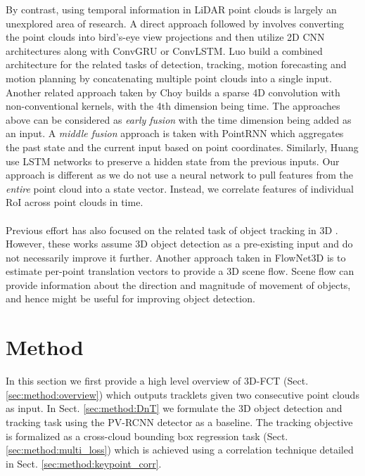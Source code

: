 \documentclass[10pt,twocolumn,letterpaper]{article}
\begin{document}
By contrast, using temporal information in LiDAR point clouds is largely an unexplored area of research. A direct approach followed by \cite{McCrae2020,Sallab2018,Yin2020} involves converting the point clouds into bird's-eye view projections and then utilize 2D CNN architectures along with ConvGRU or ConvLSTM. Luo \etal \cite{Luo2018} build a combined architecture for the related tasks of detection, tracking, motion forecasting and motion planning by concatenating multiple point clouds into a single input. Another related approach taken by Choy \etal \cite{Choy2019} builds a sparse 4D convolution with non-conventional kernels, with the 4th dimension being time. The approaches above can be considered as {\em early fusion} with the time dimension being added as an input. A {\em middle fusion} approach is taken with PointRNN \cite{Fan2019} which aggregates the past state and the current input based on point coordinates. Similarly, Huang \etal \cite{Huang2020a} use LSTM networks to preserve a hidden state from the previous inputs. Our approach is different as we do not use a neural network to pull features from the {\em entire} point cloud into a state vector. Instead, we correlate features of individual RoI across point clouds in time.
\\\\
Previous effort has also focused on the related task of object tracking in 3D \cite{Kim21ICRA,Luiten2020,Qiao2020}. However, these works assume 3D object detection as a pre-existing input and do not necessarily improve it further. Another approach taken in FlowNet3D \cite{Liu2019} is to estimate per-point translation vectors to provide a 3D scene flow. Scene flow can provide information about the direction and magnitude of movement of objects, and hence might be useful for improving object detection.

\section{Method}\label{sec:method}
In this section we first provide a high level overview of 3D-FCT (Sect. \ref{sec:method:overview}) which outputs tracklets given two consecutive point clouds as input. In Sect. \ref{sec:method:DnT} we formulate the 3D object detection and tracking task using the PV-RCNN detector \cite{Shi_2020_CVPR} as a baseline. The tracking objective is formalized as a cross-cloud bounding box regression task (Sect. \ref{sec:method:multi_loss}) which is achieved using a correlation technique detailed in Sect. \ref{sec:method:keypoint_corr}.
\end{document}
